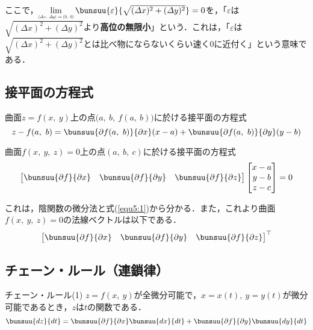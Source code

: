 ここで，$\dlim_{\scalebox{0.5}{$(\varDelta x,\ \varDelta y) \to (0,\ 0)$}} \bunsuu{\varepsilon}{\sqrt{(\varDelta x)^2 + (\varDelta y)^2}} = 0$を，「$\varepsilon$は$\sqrt{(\varDelta x)^2 + (\varDelta y)^2}$より\textbf{高位の無限小}」という．これは，「$\varepsilon$は$\sqrt{(\varDelta x)^2 + (\varDelta y)^2}$とは比べ物にならないくらい速く$0$に近付く」という意味である．



\subsection{接平面の方程式}

曲面$z = f(x,\ y)$上の点$\bigl(a,\ b,\ f(a,\ b)\bigr)$に於ける接平面の方程式
\begin{equation}
	z - f(a,\ b) = \bunsuu{\partial f(a,\ b)}{\partial x}(x - a) + \bunsuu{\partial f(a,\ b)}{\partial y}(y - b) \label{equ5:1}
\end{equation}

曲面$f(x,\ y,\ z) = 0$上の点$(a,\ b,\ c)$に於ける接平面の方程式
\begin{equation}
	\begin{bmatrix}
		\bunsuu{\partial f}{\partial x} & \bunsuu{\partial f}{\partial y} & \bunsuu{\partial f}{\partial z} 
	\end{bmatrix}
	\begin{bmatrix}
		x - a\\ y - b\\ z - c
	\end{bmatrix}
	= 0
\end{equation}

これは，陰関数の微分法と式(\ref{equ5:1})から分かる．また，これより曲面$f(x,\ y,\ z) = 0$の法線ベクトルは以下である．
\begin{equation}
	{
		\begin{bmatrix}
			\bunsuu{\partial f}{\partial x} & \bunsuu{\partial f}{\partial y} & \bunsuu{\partial f}{\partial z}
		\end{bmatrix}
	}^\top
\end{equation}



\subsection{チェーン・ルール（連鎖律）}

\begin{kousiki}{チェーン・ルール(1)}
	$z = f(x,\ y)$が全微分可能で，$x = x(t),\ y = y(t)$が微分可能であるとき，$z$は$t$の関数である．
	\begin{equation}
		\bunsuu{dz}{dt} = \bunsuu{\partial f}{\partial x}\bunsuu{dx}{dt} + \bunsuu{\partial f}{\partial y}\bunsuu{dy}{dt}
	\end{equation}
\end{kousiki}

